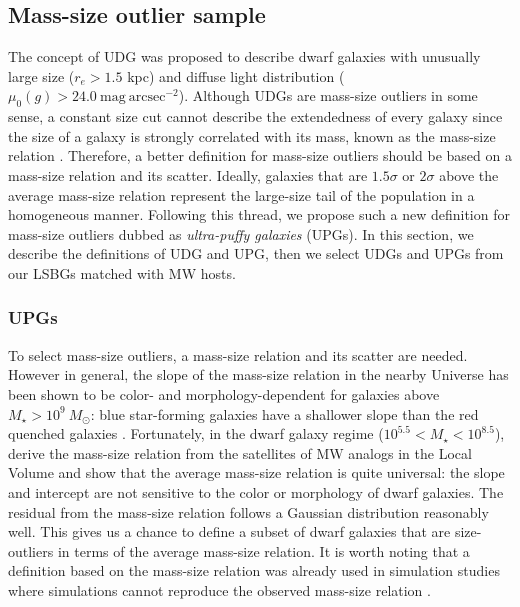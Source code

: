 \documentclass[twocolumn,astrosymb,twocolappendix]{aastex631}
\newcommand{\sbunit}{\mathrm{mag\ arcsec}^{-2}}
\newcommand{\sbcen}{\mu_{0}(g)}
\begin{document}
\begin{CJK*}{UTF8}{gbsn}
\subsection{Mass-size outlier sample}\label{sec:sample}
The concept of UDG was proposed to describe dwarf galaxies with unusually large size ($r_e>1.5$ kpc) and diffuse light distribution ($\sbcen > 24.0\ \sbunit$). Although UDGs are mass-size outliers in some sense, a constant size cut cannot describe the extendedness of every galaxy since the size of a galaxy is strongly correlated with its mass, 
known as the mass-size relation \citep[e.g.,][]{Graham2003,Trujillo2007,vanDokkum2013,Cappellari2013,Lange2015}. Therefore, a better definition for mass-size outliers should be based on a mass-size relation and its scatter. Ideally, galaxies that are $1.5\sigma$ or $2\sigma$ above the average mass-size relation represent the large-size tail of the population in a homogeneous manner. Following this thread, we propose such a new definition for mass-size outliers dubbed as \textit{ultra-puffy galaxies} (UPGs). In this section, we describe the definitions of UDG and UPG, then we select UDGs and UPGs from our LSBGs matched with MW hosts. 

\subsubsection{UPGs}
To select mass-size outliers, a mass-size relation and its scatter are needed. However in general, the slope of the mass-size relation in the nearby Universe has been shown to be color- and morphology-dependent for galaxies above $M_\star > 10^{9}\ M_\odot$: blue star-forming galaxies have a shallower slope than the red quenched galaxies \citep{Lange2015}. Fortunately, in the dwarf galaxy regime ($10^{5.5} < M_\star < 10^{8.5}$), \citet{ELVES-I} derive the mass-size relation from the satellites of MW analogs in the Local Volume and show that the average mass-size relation is quite universal: the slope and intercept are not sensitive to the color or morphology of dwarf galaxies. The residual from the mass-size relation follows a Gaussian distribution reasonably well. This gives us a chance to define a subset of dwarf galaxies that are size-outliers in terms of the average mass-size relation. It is worth noting that a definition based on the mass-size relation was already used in simulation studies where simulations cannot reproduce the observed mass-size relation \citep[e.g.,][]{Benavides2021,Benavides2022}. 


\end{CJK*}
\end{document}
